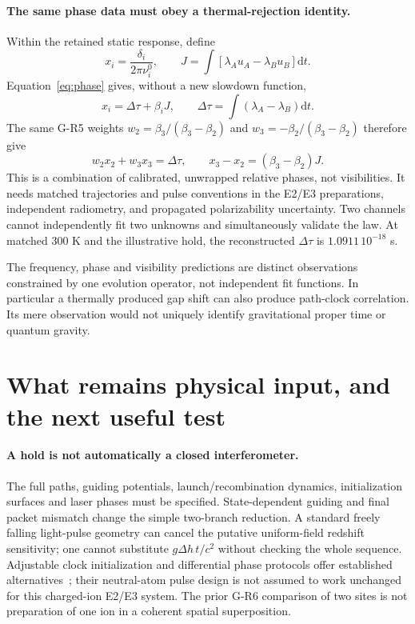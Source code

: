 \documentclass[11pt,a4paper]{article}
\newcommand{\dd}{\mathrm d}
\begin{document}
\paragraph{The same phase data must obey a thermal-rejection identity.}
Within the retained static response, define
\begin{equation}
 x_i=\frac{\delta_i}{2\pi\nu_i^0},\qquad
 J=\int[\lambda_Au_A-\lambda_Bu_B]\dd t .
\end{equation}
Equation~\eqref{eq:phase} gives, without a new slowdown function,
\begin{equation}
 x_i=\Delta\tau+\beta_iJ,\qquad
 \Delta\tau=\int(\lambda_A-\lambda_B)\dd t.
\end{equation}
The same G-R5 weights $w_2=\beta_3/(\beta_3-\beta_2)$ and
$w_3=-\beta_2/(\beta_3-\beta_2)$ therefore give
\begin{equation}\label{eq:phasecombination}
 w_2x_2+w_3x_3=\Delta\tau,\qquad
 x_3-x_2=(\beta_3-\beta_2)J.
\end{equation}
This is a combination of calibrated, unwrapped relative phases, not
visibilities. It needs matched trajectories and pulse conventions in
the E2/E3 preparations, independent radiometry, and propagated
polarizability uncertainty. Two channels cannot independently fit two
unknowns and simultaneously validate the law. At matched 300 K and
the illustrative hold, the reconstructed $\Delta\tau$ is
$1.0911\,10^{-18}$ s.

The frequency, phase and visibility predictions are distinct
observations constrained by one evolution operator, not independent
fit functions. In particular a thermally produced gap shift can also
produce path-clock correlation. Its mere observation would not
uniquely identify gravitational proper time or quantum gravity.

\newpage
\section{What remains physical input, and the next useful test}
\paragraph{A hold is not automatically a closed interferometer.}
The full paths, guiding potentials, launch/recombination dynamics,
initialization surfaces and laser phases must be specified.
State-dependent guiding and final packet mismatch change the simple
two-branch reduction. A standard freely falling light-pulse geometry
can cancel the putative uniform-field redshift sensitivity; one cannot
substitute $g\Delta h\,t/c^2$ without checking the whole sequence.
Adjustable clock initialization and differential phase protocols offer
established alternatives~\cite{roura}; their neutral-atom pulse design
is not assumed to work unchanged for this charged-ion E2/E3 system.
The prior G-R6 comparison of two sites is not preparation of one
ion in a coherent spatial superposition.
\end{document}
